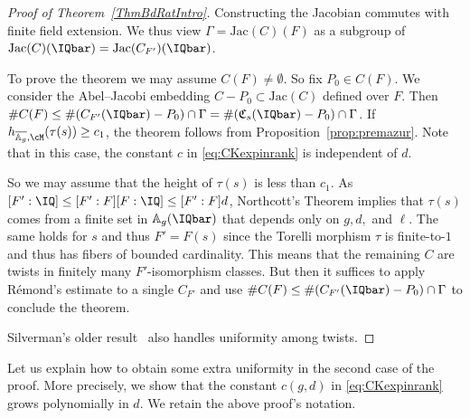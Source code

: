 \begin{proof}[Proof of Theorem~\ref{ThmBdRatIntro}]
  Constructing the
  Jacobian commutes with finite field extension. We thus view
  $\Gamma = \mathrm{Jac}(C)(F)$ as a subgroup of $\mathrm{Jac}(C)(\IQbar)
  = \mathrm{Jac}(C_{F'})(\IQbar)$.


  To prove the theorem we may assume $C(F)\not=\emptyset$. So fix
  $P_0\in C(F)$. We consider the Abel--Jacobi embedding
  $C-P_0\subset \mathrm{Jac}(C)$ defined over $F$. Then $\# C(F)\le \#
  (C_{F'}(\IQbar)-P_0)\cap\Gamma = \#
  (\mathfrak{C}_s(\IQbar)-P_0)\cap \Gamma$. If
  $h_{\overline{\mathbb{A}_g},\cM}(\tau(s))\ge c_1$, the theorem
  follows from Proposition~\ref{prop:premazur}.
  Note that in this case, the constant $c$ in \eqref{eq:CKexpinrank} is independent of $d$.

  So we may assume that the height
  of $\tau(s)$ is less than $c_1$.
  As $[F':\IQ]\le [F':F][F:\IQ]\le [F':F]d$,
  Northcott's Theorem implies
 that $\tau(s)$ comes   from a finite set in $\mathbb{A}_{g}(\IQbar)$
 that depends only on $g,d,$ and $\ell$. The same holds for $s$ and
 thus $F'=F(s)$
 since the Torelli morphism $\tau$ is finite-to-$1$ and thus   has
 fibers of bounded cardinality. %
 This means that the remaining $C$ are twists   in
 finitely many $F'$-isomorphism classes. But then it suffices to
 apply R\'emond's estimate \cite[page 643]{DPvarabII} to a single
 $C_{F'}$ and    use $\#C(F) \le \# (C_{F'}(\IQbar)-P_0)\cap\Gamma$ to
 conclude the theorem. %

Silverman's older result~\cite[Theorem 1]{Silverman:twists} also
 handles uniformity among twists.
\end{proof}

Let us explain how to obtain some extra uniformity in the second case
of the proof. More precisely, we show that the constant $c(g,d)$ in
\eqref{eq:CKexpinrank} grows polynomially in $d$. We retain the above
proof's notation.%

